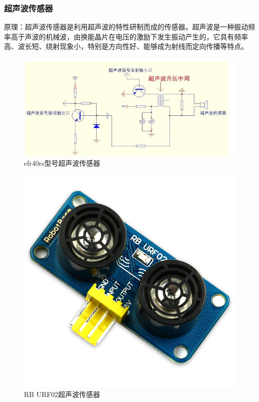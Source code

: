 \documentclass{ctexart}
\begin{document}
\subsubsection{超声波传感器}
原理：超声波传感器是利用超声波的特性研制而成的传感器。超声波是一种振动频率高于声波的机械波，由换能晶片在电压的激励下发生振动产生的，它具有频率高、波长短、绕射现象小，特别是方向性好、能够成为射线而定向传播等特点。\par
\begin{figure}[H]
\centering
    \includegraphics[width = \textwidth]{027}
    \caption{efr40rs型号超声波传感器}\par
\end{figure}
\begin{figure}[H]
\centering
    \includegraphics[width = \textwidth]{028}
    \caption{RB URF02超声波传感器}\par
\end{figure}
\end{document}
